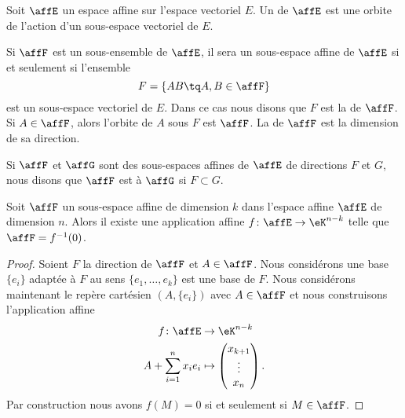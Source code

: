 \begin{definition}
	Soit \( \affE\) un espace affine sur l'espace vectoriel \( E\). Un  de \( \affE\) est une orbite de l'action d'un sous-espace vectoriel de \( E\).
\end{definition}

Si \( \affF\) est un sous-ensemble de \( \affE\), il sera un sous-espace affine de \( \affE\) si et seulement si l'ensemble
\begin{equation}
	F=\{ AB\tq A,B\in\affF \}
\end{equation}
est un sous-espace vectoriel de \( E\). Dans ce cas nous disons que \( F\) est la  de \( \affF\). Si \( A\in\affF\), alors l'orbite de \( A\) sous \( F\) est \( \affF\). La  de \( \affF\) est la dimension de sa direction.

Si \( \affF\) et \( \affG\) sont des sous-espaces affines de \( \affE\) de directions \( F\) et \( G\), nous disons que \( \affF\) est  à \( \affG\) si \( F\subset G\).

\begin{proposition}
	Soit \( \affF\) un sous-espace affine de dimension \( k\) dans l'espace affine \( \affE\) de dimension \( n\). Alors il existe une application affine \( f\colon \affE\to \eK^{n-k}\) telle que \( \affF=f^{-1}(0)\).
\end{proposition}

\begin{proof}
	Soient \( F\) la direction de \( \affF\) et \( A\in\affF\). Nous considérons une base \( \{ e_i \}\) adaptée à \( F\) au sens \( \{ e_1,\ldots, e_k \}\) est une base de \( F\). Nous considérons maintenant le repère cartésien \( (A,\{ e_i \})\) avec \( A\in\affF\) et nous construisons l'application affine
	\begin{equation}
		\begin{aligned}
			f\colon \affE        & \to \eK^{n-k}                       \\
			A+\sum_{i=1}^nx_ie_i & \mapsto \begin{pmatrix}
				x_{k+1} \\
				\vdots  \\
				x_n
			\end{pmatrix}.
		\end{aligned}
	\end{equation}
	Par construction nous avons \( f(M)=0\) si et seulement si \( M\in\affF\).
\end{proof}

